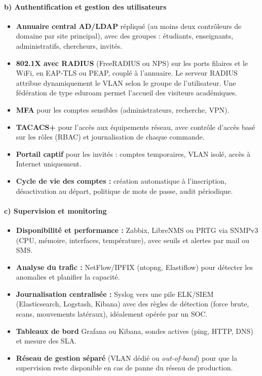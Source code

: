 \documentclass[12pt,a4paper]{article}
\begin{document}
\paragraph{b) Authentification et gestion des utilisateurs}

\begin{itemize}
    \item \textbf{Annuaire central AD/LDAP} répliqué (au moins deux
    contrôleurs de domaine par site principal), avec des groupes :
    étudiants, enseignants, administratifs, chercheurs, invités.
    \item \textbf{802.1X avec RADIUS} (FreeRADIUS ou NPS) sur les ports
    filaires et le WiFi, en EAP-TLS ou PEAP, couplé à l'annuaire. Le
    serveur RADIUS attribue dynamiquement le VLAN selon le groupe de
    l'utilisateur. Une fédération de type eduroam permet l'accueil des
    visiteurs académiques.
    \item \textbf{MFA} pour les comptes sensibles (administrateurs,
    recherche, VPN).
    \item \textbf{TACACS+} pour l'accès aux équipements réseau, avec
    contrôle d'accès basé sur les rôles (RBAC) et journalisation de
    chaque commande.
    \item \textbf{Portail captif} pour les invités : comptes temporaires,
    VLAN isolé, accès à Internet uniquement.
    \item \textbf{Cycle de vie des comptes :} création automatique à
    l'inscription, désactivation au départ, politique de mots de passe,
    audit périodique.
\end{itemize}

\paragraph{c) Supervision et monitoring}

\begin{itemize}
    \item \textbf{Disponibilité et performance :} Zabbix, LibreNMS ou
    PRTG via SNMPv3 (CPU, mémoire, interfaces, température), avec seuils
    et alertes par mail ou SMS.
    \item \textbf{Analyse du trafic :} NetFlow/IPFIX (ntopng, Elastiflow)
    pour détecter les anomalies et planifier la capacité.
    \item \textbf{Journalisation centralisée :} Syslog vers une pile
    ELK/SIEM (Elasticsearch, Logstash, Kibana) avec des règles de
    détection (force brute, scans, mouvements latéraux), idéalement
    opérée par un SOC.
    \item \textbf{Tableaux de bord} Grafana ou Kibana, sondes actives
    (ping, HTTP, DNS) et mesure des SLA.
    \item \textbf{Réseau de gestion séparé} (VLAN dédié ou
    \textit{out-of-band}) pour que la supervision reste disponible en
    cas de panne du réseau de production.
\end{itemize}
\end{document}
